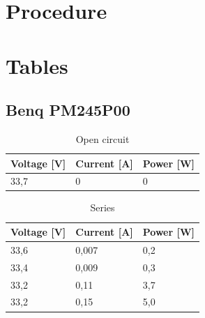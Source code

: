 \documentclass[12pt]{article}
\begin{document}
\section{Procedure}
\section{Tables}
\subsection{Benq PM245P00}
\begin{table}[h]
	\centering
	\begin{tabular}{|p{2cm}|p{2cm}|p{2cm}|}
		\hline
		\rowcolor{RoyalBlue!80} Voltage [V] & Current [A] & Power [W] \\
		\hline
		\rowcolor{Cerulean!70} 33,7         & 0           & 0         \\
		\hline
	\end{tabular}
	\caption{Open circuit}
	\label{tab:my_label}
\end{table}

\begin{table}[h]
	\centering
	\begin{tabular}{|p{2cm}|p{2cm}|p{2cm}|}
		\hline
		\rowcolor{Green!80} Voltage [V] & Current [A] & Power [W] \\
		\hline
		\rowcolor{LimeGreen!70} 33,6    & 0,007       & 0,2       \\
		\hline
		\rowcolor{YellowGreen!70} 33,4  & 0,009       & 0,3       \\
		\hline
		\rowcolor{LimeGreen!70} 33,2    & 0,11        & 3,7       \\
		\hline
		\rowcolor{YellowGreen!70} 33,2  & 0,15        & 5,0       \\
		\hline
	\end{tabular}
	\caption{Series}
	\label{tab:my_label}
\end{table}
\end{document}
